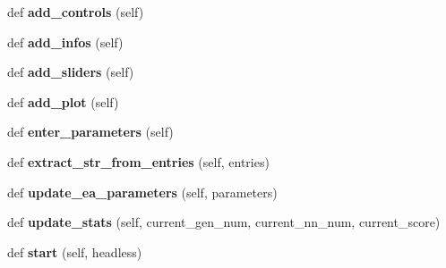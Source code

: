 \begin{DoxyCompactItemize}
\item 
def {\bfseries add\+\_\+controls} (self)\hypertarget{classMachineGamingWindow_1_1MachineGaming_a950b8b5c01ad4e252962975e4aff2462}{}\label{classMachineGamingWindow_1_1MachineGaming_a950b8b5c01ad4e252962975e4aff2462}

\item 
def {\bfseries add\+\_\+infos} (self)\hypertarget{classMachineGamingWindow_1_1MachineGaming_a8dd27be9c10d82562f372487a9ccff9a}{}\label{classMachineGamingWindow_1_1MachineGaming_a8dd27be9c10d82562f372487a9ccff9a}

\item 
def {\bfseries add\+\_\+sliders} (self)\hypertarget{classMachineGamingWindow_1_1MachineGaming_a4855e87b4596d63add3e6c6eea4c37cd}{}\label{classMachineGamingWindow_1_1MachineGaming_a4855e87b4596d63add3e6c6eea4c37cd}

\item 
def {\bfseries add\+\_\+plot} (self)\hypertarget{classMachineGamingWindow_1_1MachineGaming_aa4bb598e038b65f082e04580b22cc2ba}{}\label{classMachineGamingWindow_1_1MachineGaming_aa4bb598e038b65f082e04580b22cc2ba}

\item 
def {\bfseries enter\+\_\+parameters} (self)\hypertarget{classMachineGamingWindow_1_1MachineGaming_a2afef0dcf7a24256613e5ffcf11dabe5}{}\label{classMachineGamingWindow_1_1MachineGaming_a2afef0dcf7a24256613e5ffcf11dabe5}

\item 
def {\bfseries extract\+\_\+str\+\_\+from\+\_\+entries} (self, entries)\hypertarget{classMachineGamingWindow_1_1MachineGaming_aa9bd6a0d8ddb5378b885f3f03c454321}{}\label{classMachineGamingWindow_1_1MachineGaming_aa9bd6a0d8ddb5378b885f3f03c454321}

\item 
def {\bfseries update\+\_\+ea\+\_\+parameters} (self, parameters)\hypertarget{classMachineGamingWindow_1_1MachineGaming_a5fe0b618eea8c6b463487e4a34812a11}{}\label{classMachineGamingWindow_1_1MachineGaming_a5fe0b618eea8c6b463487e4a34812a11}

\item 
def {\bfseries update\+\_\+stats} (self, current\+\_\+gen\+\_\+num, current\+\_\+nn\+\_\+num, current\+\_\+score)\hypertarget{classMachineGamingWindow_1_1MachineGaming_a04ab71cba412f5717ebaff5c9ca12346}{}\label{classMachineGamingWindow_1_1MachineGaming_a04ab71cba412f5717ebaff5c9ca12346}

\item 
def {\bfseries start} (self, headless)\hypertarget{classMachineGamingWindow_1_1MachineGaming_a3a9714707ad07433db600a5145064fd0}{}\label{classMachineGamingWindow_1_1MachineGaming_a3a9714707ad07433db600a5145064fd0}


\end{DoxyCompactItemize}
